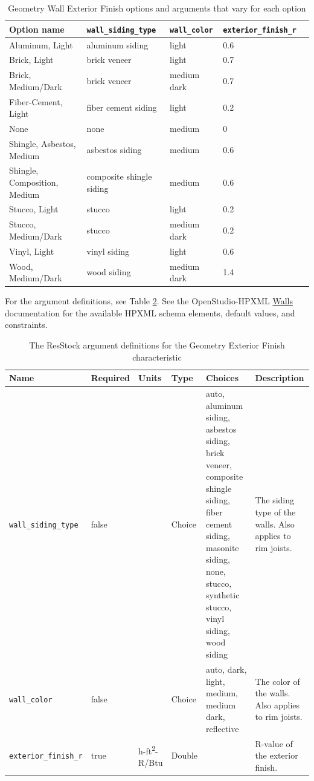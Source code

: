 \begin{longtable}[]{|p{3.5cm}|p{2.5cm}|p{}|p{2.5cm}|p{2.5cm}|} \caption{Geometry Wall Exterior Finish options and arguments that vary for each option} \label{table:hc_opt_geo_wall_ext_fin} \\  

\toprule\noalign{}
Option name & \texttt{wall\_siding\_type} &
\texttt{wall\_color} & \texttt{exterior\_finish\_r} \\
\midrule\noalign{}
\endhead
\bottomrule\noalign{}
\endlastfoot
Aluminum, Light & aluminum siding & light & 0.6 \\ \hline
Brick, Light & brick veneer & light & 0.7 \\\hline
Brick, Medium/Dark & brick veneer & medium dark & 0.7 \\\hline
Fiber-Cement, Light & fiber cement siding & light & 0.2 \\\hline
None & none & medium & 0 \\\hline
Shingle, Asbestos, Medium & asbestos siding & medium & 0.6 \\\hline
Shingle, Composition, Medium & composite shingle siding & medium
& 0.6 \\\hline
Stucco, Light & stucco & light & 0.2 \\\hline
Stucco, Medium/Dark & stucco & medium dark & 0.2 \\\hline
Vinyl, Light & vinyl siding & light & 0.6 \\\hline
Wood, Medium/Dark & wood siding & medium dark & 1.4 \\\hline
\end{longtable}

For the argument definitions, see Table \ref{table:hc_arg_def_ext_finish}. See the OpenStudio-HPXML \href{https://openstudio-hpxml.readthedocs.io/en/v1.8.1/workflow_inputs.html#hpxml-walls}{Walls} documentation for the available HPXML schema elements, default values, and constraints.

\begin{longtable}[]{|p{3.5cm}|p{1.5cm}|p{1.3cm}|p{1.1cm}|p{}|p{3.3cm}|}
\caption{The ResStock argument definitions for the Geometry Exterior Finish characteristic} \label{table:hc_arg_def_ext_finish} \\
\toprule\noalign{}
Name & Required & Units & Type & Choices & Description \\
\midrule\noalign{}
\endhead
\bottomrule\noalign{}
\endlastfoot
\texttt{wall\_siding\_type} & false & & Choice & auto, aluminum siding,
asbestos siding, brick veneer, composite shingle siding, fiber cement
siding, masonite siding, none, stucco, synthetic stucco, vinyl siding,
wood siding & The siding type of the walls. Also applies to rim joists. \\
\hline
\texttt{wall\_color} & false & & Choice & auto, dark, light, medium,
medium dark, reflective & The color of the walls. Also applies to rim
joists.  \\
\hline
\texttt{exterior\_finish\_r} & true & h-ft\textsuperscript{2}-R/Btu & Double & &
R-value of the exterior finish. \\
\end{longtable}
